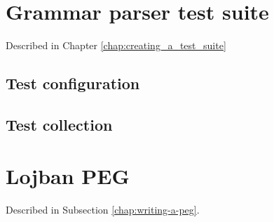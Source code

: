 

\chapter{Grammar parser test suite}
\label{appendix:parser-testing-annex}

Described in Chapter \ref{chap:creating_a_test_suite}

\section{Test configuration}



\newpage

\section{Test collection}



\chapter{Lojban PEG}
\label{appendix:peg-annex}

Described in Subsection \ref{chap:writing-a-peg}.

